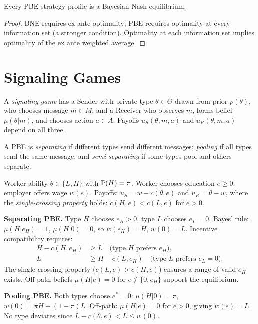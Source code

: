 \documentclass[11pt,a4paper]{article}
\begin{document}
\begin{proposition}
\label{prop:pbe-bne}
Every PBE strategy profile is a Bayesian Nash equilibrium.
\end{proposition}

\begin{proof}
BNE requires ex ante optimality; PBE requires optimality at every
information set (a stronger condition). Optimality at each information
set implies optimality of the ex ante weighted average.
\end{proof}


\section{Signaling Games}
\label{sec:signaling}

\begin{definition}
\label{def:signaling-game}
A \emph{signaling game} has a Sender with private type
$\theta \in \Theta$ drawn from prior $p(\theta)$, who chooses message
$m \in M$; and a Receiver who observes $m$, forms belief
$\mu(\theta|m)$, and chooses action $a \in A$. Payoffs
$u_S(\theta,m,a)$ and $u_R(\theta,m,a)$ depend on all three.
\end{definition}

\begin{definition}
\label{def:eq-types}
A PBE is \emph{separating} if different types send different messages;
\emph{pooling} if all types send the same message; and
\emph{semi-separating} if some types pool and others separate.
\end{definition}

\begin{example}
\label{ex:spence}
Worker ability $\theta \in \{L, H\}$ with $\mathbb{P}(H) = \pi$. Worker
chooses education $e \geq 0$; employer offers wage $w(e)$. Payoffs:
$u_S = w - c(\theta, e)$ and $u_R = \theta - w$, where the
\emph{single-crossing property} holds: $c(H,e) < c(L,e)$ for $e > 0$.

\textbf{Separating PBE.} Type $H$ chooses $e_H > 0$, type $L$ chooses
$e_L = 0$. Bayes' rule: $\mu(H|e_H) = 1$, $\mu(H|0) = 0$, so
$w(e_H) = H$, $w(0) = L$. Incentive compatibility requires:
\begin{align*}
    H - c(H, e_H) &\geq L \quad\text{(type $H$ prefers $e_H$)}, \\
    L &\geq H - c(L, e_H) \quad\text{(type $L$ prefers $e_L = 0$)}.
\end{align*}
The single-crossing property ($c(L,e) > c(H,e)$) ensures a range of
valid $e_H$ exists. Off-path beliefs $\mu(H|e) = 0$ for
$e \notin \{0, e_H\}$ support the equilibrium.

\textbf{Pooling PBE.} Both types choose $e^* = 0$:
$\mu(H|0) = \pi$, $w(0) = \pi H + (1-\pi)L$. Off-path:
$\mu(H|e) = 0$ for $e > 0$, giving $w(e) = L$. No type deviates
since $L - c(\theta,e) < L \leq w(0)$.
\end{example}
\end{document}
